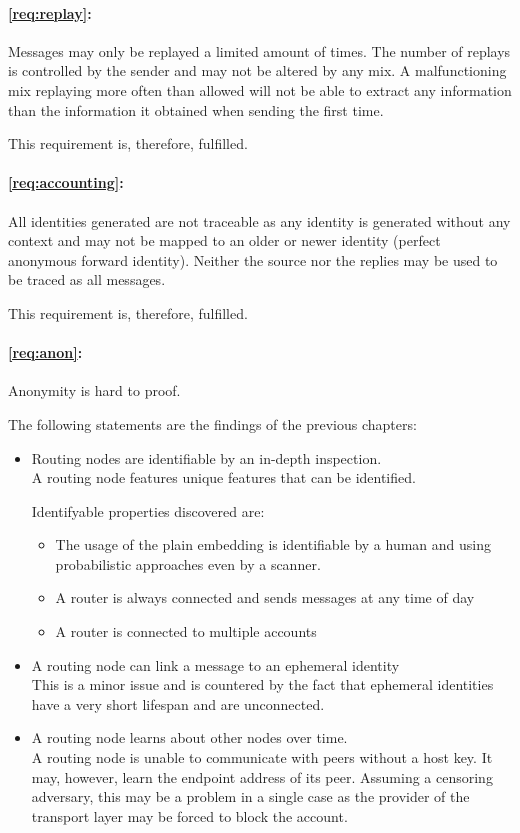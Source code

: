 \paragraph*{\ref{req:replay}:} Messages may only be replayed a limited amount of times. The number of replays is controlled by the sender and may not be altered by any mix. A malfunctioning mix replaying more often than allowed will not be able to extract any information than the information it obtained when sending the first time. 

This requirement is, therefore, fulfilled.

\paragraph*{\ref{req:accounting}:} 
All identities generated are not traceable as any identity is generated without any context and may not be mapped to an older or newer identity (perfect anonymous forward identity). Neither the source nor the replies may be used to be traced as all messages. 

This requirement is, therefore, fulfilled.

\paragraph*{\ref{req:anon}:} Anonymity is hard to proof. 

The following statements are the findings of the previous chapters:
\begin{itemize}
	\item Routing nodes are identifiable by an in-depth inspection.\\
	A routing node features unique features that can be identified. 
	
	Identifyable properties discovered are:
	\begin{itemize}
		\item The usage of the plain embedding is identifiable by a human and using probabilistic approaches even by a scanner.
		\item A router is always connected and sends messages at any time of day
		\item A router is connected to multiple accounts
	\end{itemize}
	\item A routing node can link a message to an ephemeral identity\\
	This is a minor issue and is countered by the fact that ephemeral identities have a very short lifespan and are unconnected.
	\item A routing node learns about other nodes over time.\\
	A routing node is unable to communicate with peers without a host key. It may, however, learn the endpoint address of its peer. Assuming a censoring adversary, this may be a problem in a single case as the provider of the transport layer may be forced to block the account.
\end{itemize}

